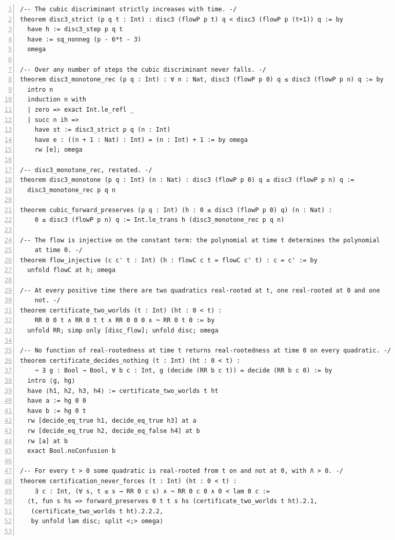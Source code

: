 \documentclass[10pt]{article}
\newcommand{\leansize}{\fontsize{5.5pt}{6.75pt}\selectfont}
\begin{document}
\begin{multicols}{2}
\begin{Verbatim}[numbers=left,firstnumber=1,numbersep=3pt,xleftmargin=2.6em,breaklines=true,breakanywhere=true,breakautoindent=false,breakindent=1.4em,breaksymbolleft={},breakanywheresymbolpre={},fontsize=\leansize]
/-- The cubic discriminant strictly increases with time. -/
theorem disc3_strict (p q t : Int) : disc3 (flowP p t) q < disc3 (flowP p (t+1)) q := by
  have h := disc3_step p q t
  have := sq_nonneg (p - 6*t - 3)
  omega

/-- Over any number of steps the cubic discriminant never falls. -/
theorem disc3_monotone_rec (p q : Int) : ∀ n : Nat, disc3 (flowP p 0) q ≤ disc3 (flowP p n) q := by
  intro n
  induction n with
  | zero => exact Int.le_refl _
  | succ n ih =>
    have st := disc3_strict p q (n : Int)
    have e : ((n + 1 : Nat) : Int) = (n : Int) + 1 := by omega
    rw [e]; omega

/-- disc3_monotone_rec, restated. -/
theorem disc3_monotone (p q : Int) (n : Nat) : disc3 (flowP p 0) q ≤ disc3 (flowP p n) q :=
  disc3_monotone_rec p q n

theorem cubic_forward_preserves (p q : Int) (h : 0 ≤ disc3 (flowP p 0) q) (n : Nat) :
    0 ≤ disc3 (flowP p n) q := Int.le_trans h (disc3_monotone_rec p q n)

/-- The flow is injective on the constant term: the polynomial at time t determines the polynomial
    at time 0. -/
theorem flow_injective (c c' t : Int) (h : flowC c t = flowC c' t) : c = c' := by
  unfold flowC at h; omega

/-- At every positive time there are two quadratics real-rooted at t, one real-rooted at 0 and one
    not. -/
theorem certificate_two_worlds (t : Int) (ht : 0 < t) :
    RR 0 0 t ∧ RR 0 t t ∧ RR 0 0 0 ∧ ¬ RR 0 t 0 := by
  unfold RR; simp only [disc_flow]; unfold disc; omega

/-- No function of real-rootedness at time t returns real-rootedness at time 0 on every quadratic. -/
theorem certificate_decides_nothing (t : Int) (ht : 0 < t) :
    ¬ ∃ g : Bool → Bool, ∀ b c : Int, g (decide (RR b c t)) = decide (RR b c 0) := by
  intro ⟨g, hg⟩
  have ⟨h1, h2, h3, h4⟩ := certificate_two_worlds t ht
  have a := hg 0 0
  have b := hg 0 t
  rw [decide_eq_true h1, decide_eq_true h3] at a
  rw [decide_eq_true h2, decide_eq_false h4] at b
  rw [a] at b
  exact Bool.noConfusion b

/-- For every t > 0 some quadratic is real-rooted from t on and not at 0, with Λ > 0. -/
theorem certification_never_forces (t : Int) (ht : 0 < t) :
    ∃ c : Int, (∀ s, t ≤ s → RR 0 c s) ∧ ¬ RR 0 c 0 ∧ 0 < lam 0 c :=
  ⟨t, fun s hs => forward_preserves 0 t t s hs (certificate_two_worlds t ht).2.1,
   (certificate_two_worlds t ht).2.2.2,
   by unfold lam disc; split <;> omega⟩


\end{Verbatim}
\end{multicols}
\end{document}
